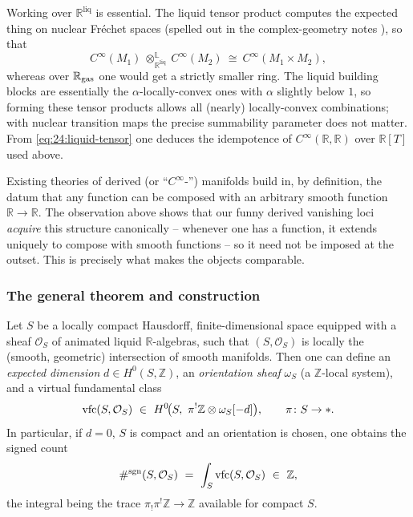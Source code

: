 \begin{remark}
\label{rmk:24:liquid-tensor}
Working over $\mathbb R^{\mathrm{liq}}$ is essential. The liquid tensor product
computes the expected thing on nuclear Fréchet spaces (spelled out in the
complex-geometry notes \cite{scholze2020analytic}), so that
\begin{equation}
\label{eq:24:liquid-tensor}
C^\infty(M_1)\ \otimes_{\mathbb R^{\mathrm{liq}}}^{\mathbb L}\ C^\infty(M_2)\
\cong\ C^\infty(M_1\times M_2),
\end{equation}
whereas over $\mathbb R_{\mathrm{gas}}$ one would get a strictly smaller ring. The liquid
building blocks are essentially the $\alpha$-locally-convex ones with $\alpha$
slightly below $1$, so forming these tensor products allows all (nearly)
locally-convex combinations; with nuclear transition maps the precise summability
parameter does not matter. From \eqref{eq:24:liquid-tensor} one deduces the
idempotence of $C^\infty(\mathbb R,\mathbb R)$ over $\mathbb R[T]$ used above.
\end{remark}

\begin{remark}
\label{rmk:24:cinfty-ring}
Existing theories of derived (or ``$C^\infty$-'') manifolds build in, by
definition, the datum that any function can be composed with an arbitrary smooth
function $\mathbb R\to\mathbb R$. The observation above shows that our funny
derived vanishing loci \emph{acquire} this structure canonically -- whenever one
has a function, it extends uniquely to compose with smooth functions -- so it
need not be imposed at the outset. This is precisely what makes the objects
comparable.
\end{remark}

\subsubsection*{The general theorem and construction}

\begin{theorem}
\label{thm:24:vfc}
Let $S$ be a locally compact Hausdorff, finite-dimensional space equipped with a
sheaf $\mathcal O_S$ of animated liquid $\mathbb R$-algebras, such that
$(S,\mathcal O_S)$ is locally the (smooth, geometric) intersection of smooth
manifolds. Then one can define an \emph{expected dimension}
$d\in H^0(S,\mathbb Z)$, an \emph{orientation sheaf} $\omega_S$ (a
$\mathbb Z$-local system), and a virtual fundamental class
\begin{equation*}
\vfc(S,\mathcal O_S)\ \in\ H^0\!\bigl(S,\ \pi^!\mathbb Z\otimes\omega_S[-d]\bigr),
\qquad \pi\colon S\to\ast .
\end{equation*}
In particular, if $d=0$, $S$ is compact and an orientation is chosen, one obtains
the signed count
\begin{equation*}
\#^{\mathrm{sgn}}(S,\mathcal O_S)\ =\ \int_S\vfc(S,\mathcal O_S)\ \in\ \mathbb Z ,
\end{equation*}
the integral being the trace $\pi_!\pi^!\mathbb Z\to\mathbb Z$ available for
compact $S$.
\end{theorem}

